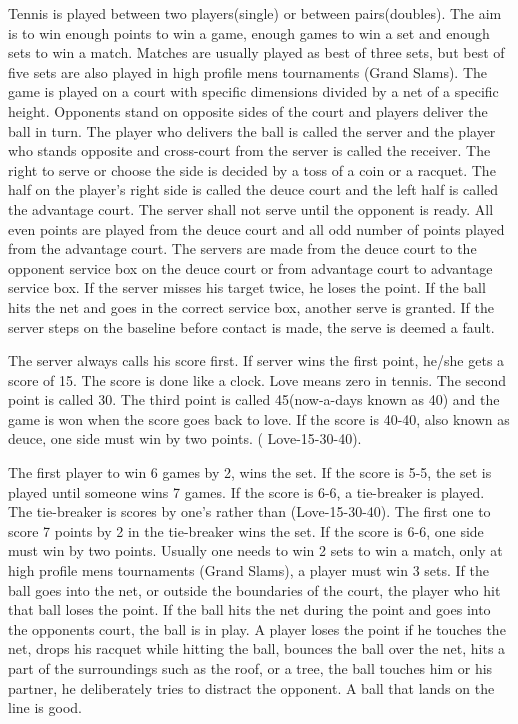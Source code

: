 \documentclass[10pt]{report}
\begin{document}
Tennis is played between two players(single) or between pairs(doubles).
The aim is to win enough points to win a game, enough games to win
a set and enough sets to win a match. Matches are usually played as best of three
sets, but best of five sets are also played in high profile mens tournaments (Grand
Slams). 
The game is played on a court with specific dimensions divided by a net of a specific height.
Opponents stand on opposite sides of the court and players deliver the ball in turn.
The player who delivers the ball is called the server and the player who stands opposite and cross-court from the server
is called the receiver. 
The right to serve or choose the side is decided by a toss of a coin or a racquet.
The half on the player's right side is called the deuce court and the left half is called the advantage court. 
The server shall not serve until the opponent is ready. All even points are played from the deuce court and 
all odd number of points played from the advantage court. The servers are made from the deuce court to the opponent service box
on the deuce court or from advantage court to advantage service box. If the server misses his target twice, he loses the point. 
If the ball hits the net and goes in the correct service box, another serve is granted. If the server steps on the baseline before contact is made, 
the serve is deemed a fault. 

The server always calls his score first. If server wins the first point, he/she gets a score of 15. The score is done like a clock. Love means zero in tennis.
The second point is called 30. The third point is called 45(now-a-days known as 40) and the game is won when the score goes back to love. If the score is 40-40, 
also known as deuce, one side must win by two points. ( Love-15-30-40).

The first player to win 6 games by 2, wins the set. If the score is 5-5, the set is played until someone wins 7 games. If the score is 6-6, a tie-breaker is played.
The tie-breaker is scores by one's rather than (Love-15-30-40). The first one to score 7 points by 2 in the tie-breaker wins the set. If the score is 6-6, one side must win
by two points. 
Usually one needs to win 2 sets to win a match, only at high profile mens tournaments (Grand Slams), a player must win 3 sets. 
If the ball goes into the net, or outside the boundaries of the court, the player who hit that ball loses the point. If the ball hits the net during the point and goes into the opponents court, the ball is in play. A player loses the point if he touches the net, drops his racquet while hitting the ball, bounces the ball over the net, hits a part of the surroundings such as the roof, or a tree, the ball touches him or his partner, he deliberately tries to distract the opponent.
A ball that lands on the line is good.
\end{document}
